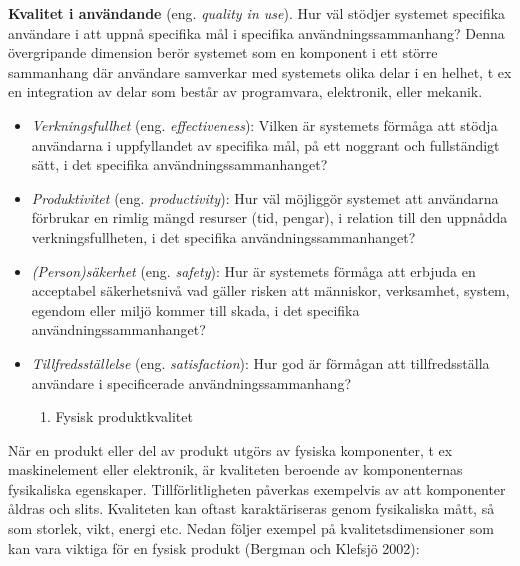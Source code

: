 \textbf{Kvalitet i användande} (eng. \emph{quality in use}). Hur väl
stödjer systemet specifika användare i att uppnå specifika mål i
specifika användningssammanhang? Denna övergripande dimension berör
systemet som en komponent i ett större sammanhang där användare
samverkar med systemets olika delar i en helhet, t ex en integration av
delar som består av programvara, elektronik, eller mekanik.

\begin{itemize}
\item
  \emph{Verkningsfullhet} (eng. \emph{effectiveness}): Vilken är
  systemets förmåga att stödja användarna i uppfyllandet av specifika
  mål, på ett noggrant och fullständigt sätt, i det specifika
  användningssammanhanget?
\item
  \emph{Produktivitet} (eng. \emph{productivity}): Hur väl möjliggör
  systemet att användarna förbrukar en rimlig mängd resurser (tid,
  pengar), i relation till den uppnådda verkningsfullheten, i det
  specifika användningssammanhanget?
\item
  \emph{(Person)säkerhet} (eng. \emph{safety}): Hur är systemets förmåga
  att erbjuda en acceptabel säkerhetsnivå vad gäller risken att
  människor, verksamhet, system, egendom eller miljö kommer till skada,
  i det specifika användningssammanhanget?
\item
  \emph{Tillfredsställelse} (eng. \emph{satisfaction}): Hur god är
  förmågan att tillfredsställa användare i specificerade
  användningssammanhang?

  \begin{enumerate}
  \def\labelenumi{\arabic{enumi}.}
  \item
    Fysisk produktkvalitet
  \end{enumerate}
\end{itemize}

När en produkt eller del av produkt utgörs av fysiska komponenter, t ex
maskinelement eller elektronik, är kvaliteten beroende av komponenternas
fysikaliska egenskaper. Tillförlitligheten påverkas exempelvis av att
komponenter åldras och slits. Kvaliteten kan oftast karaktäriseras genom
fysikaliska mått, så som storlek, vikt, energi etc. Nedan följer exempel
på kvalitetsdimensioner som kan vara viktiga för en fysisk produkt
(Bergman och Klefsjö 2002):

